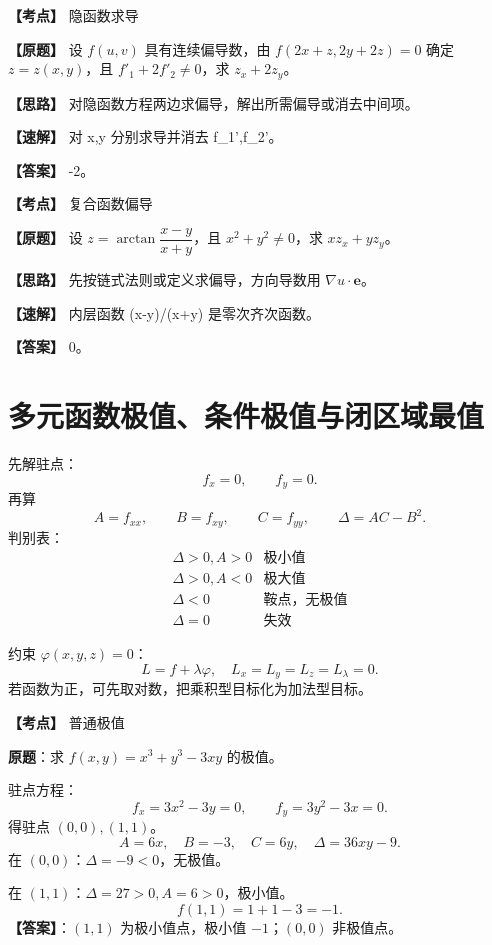﻿\documentclass[11pt,a4paper,UTF8]{ctexart}
\begin{document}
\newpage

\begin{answerbox}[2024--2025 二]
\textbf{【考点】} 隐函数求导

\textbf{【原题】} 设 $f(u,v)$ 具有连续偏导数，由 $f(2x+z,2y+2z)=0$ 确定 $z=z(x,y)$，且 $f'_1+2f'_2\ne0$，求 $z_x+2z_y$。

\textbf{【思路】} 对隐函数方程两边求偏导，解出所需偏导或消去中间项。

\textbf{【速解】} 对 x,y 分别求导并消去 f\_1',f\_2'。

\textbf{【答案】} -2。
\end{answerbox}

\begin{answerbox}[2023--2024 二-1]
\textbf{【考点】} 复合函数偏导

\textbf{【原题】} 设 $z=\arctan\dfrac{x-y}{x+y}$，且 $x^2+y^2\ne0$，求 $xz_x+yz_y$。

\textbf{【思路】} 先按链式法则或定义求偏导，方向导数用 $\nabla u\cdot\boldsymbol e$。

\textbf{【速解】} 内层函数 (x-y)/(x+y) 是零次齐次函数。

\textbf{【答案】} 0。
\end{answerbox}
\section{多元函数极值、条件极值与闭区域最值}

\begin{templatebox}[普通极值判别]
先解驻点：
\[
f_x=0,
\qquad f_y=0.
\]
再算
\[
A=f_{xx},\qquad B=f_{xy},\qquad C=f_{yy},\qquad \Delta=AC-B^2.
\]
判别表：
\[
\begin{array}{c|c}
\Delta>0,A>0&\text{极小值}\\
\Delta>0,A<0&\text{极大值}\\
\Delta<0&\text{鞍点，无极值}\\
\Delta=0&\text{失效}
\end{array}
\]
\end{templatebox}

\begin{templatebox}[条件极值模板]
约束 $\varphi(x,y,z)=0$：
\[
L=f+\lambda\varphi,
\quad L_x=L_y=L_z=L_\lambda=0.
\]
若函数为正，可先取对数，把乘积型目标化为加法型目标。
\end{templatebox}

\begin{answerbox}[2023--2024 二-3]
\textbf{【考点】} 普通极值

\textbf{原题}：求 $f(x,y)=x^3+y^3-3xy$ 的极值。

驻点方程：
\[
f_x=3x^2-3y=0,
\qquad f_y=3y^2-3x=0.
\]
得驻点 $(0,0),(1,1)$。
\[
A=6x,
\quad B=-3,
\quad C=6y,
\quad \Delta=36xy-9.
\]
在 $(0,0)$：$\Delta=-9<0$，无极值。

在 $(1,1)$：$\Delta=27>0,A=6>0$，极小值。
\[
f(1,1)=1+1-3=-1.
\]
\textbf{【答案】}：$(1,1)$ 为极小值点，极小值 $-1$；$(0,0)$ 非极值点。
\end{answerbox}
\end{document}
